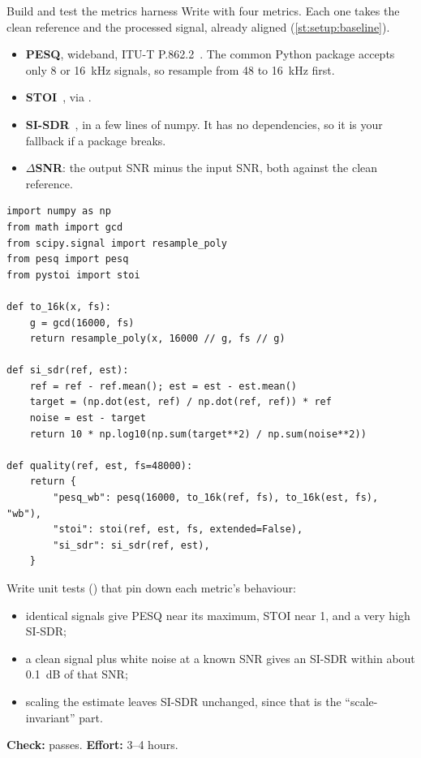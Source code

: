 \begin{stepbox}[label=st:setup:metrics]{Build and test the metrics harness}
Write  with four metrics. Each one takes the clean
reference and the processed signal, already aligned
(\cref{st:setup:baseline}).

\begin{itemize}
  \item \textbf{PESQ}, wideband, ITU-T P.862.2~\cite{itu2001pesq,itu2007pesqwb}.
  The common Python package  accepts only 8 or \qty{16}{\kHz}
  signals, so resample from 48 to \qty{16}{\kHz} first.
  \item \textbf{STOI}~\cite{taal2011stoi}, via .
  \item \textbf{SI-SDR}~\cite{leroux2019sisdr}, in a few lines of numpy. It has
  no dependencies, so it is your fallback if a package breaks.
  \item \textbf{$\Delta$SNR}: the output SNR minus the input SNR, both against
  the clean reference.
\end{itemize}

\begin{lstlisting}[style=py,caption={The core of \texttt{metrics/quality.py}.}]
import numpy as np
from math import gcd
from scipy.signal import resample_poly
from pesq import pesq
from pystoi import stoi

def to_16k(x, fs):
    g = gcd(16000, fs)
    return resample_poly(x, 16000 // g, fs // g)

def si_sdr(ref, est):
    ref = ref - ref.mean(); est = est - est.mean()
    target = (np.dot(est, ref) / np.dot(ref, ref)) * ref
    noise = est - target
    return 10 * np.log10(np.sum(target**2) / np.sum(noise**2))

def quality(ref, est, fs=48000):
    return {
        "pesq_wb": pesq(16000, to_16k(ref, fs), to_16k(est, fs), "wb"),
        "stoi": stoi(ref, est, fs, extended=False),
        "si_sdr": si_sdr(ref, est),
    }
\end{lstlisting}

Write unit tests () that pin down each metric's
behaviour:
\begin{itemize}
  \item identical signals give PESQ near its maximum, STOI near 1, and a very
        high SI-SDR;
  \item a clean signal plus white noise at a known SNR gives an SI-SDR within
        about \qty{0.1}{\dB} of that SNR;
  \item scaling the estimate leaves SI-SDR unchanged, since that is the
        \enquote{scale-invariant} part.
\end{itemize}

\textbf{Check:}  passes. \textbf{Effort:} 3--4 hours.
\end{stepbox}

